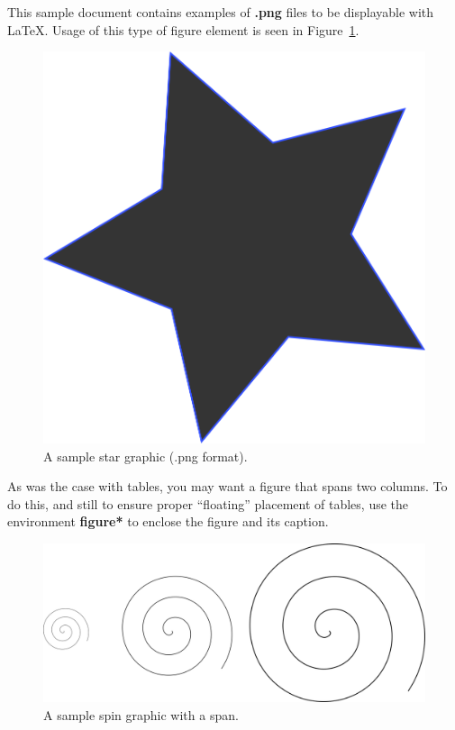 \documentclass[article]{stucosrec}
\begin{document}
	This sample document contains examples of \textbf{.png} files to be displayable with \LaTeX.
	Usage of this type of figure element is seen in Figure~\ref{fig:star}.
	
	\begin{figure}
		\centering
		\includegraphics[scale=0.5]{star.png}
		\caption{A sample star graphic (.png format).}
		\label{fig:star}
	\end{figure}

	As was the case with tables, you may want a figure
that spans two columns.
	To do this, and still to
ensure proper ``floating'' placement of tables, use the environment
\textbf{figure*} to enclose the figure and its caption.
	
	\begin{figure}
		\centering
		\includegraphics[scale=0.8]{spin.png}
		\caption{A sample spin graphic with a span.}
		\label{fig:spin}
	\end{figure}
	
\end{document}
